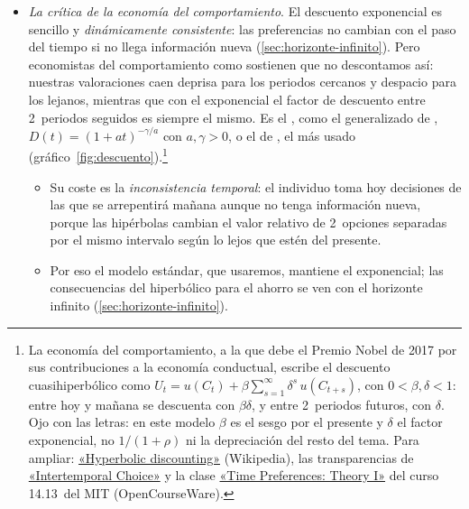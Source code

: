 \documentclass[11pt]{article}
\begin{document}
\begin{itemize}
\item \emph{La crítica de la economía del comportamiento}. El descuento exponencial es sencillo y \emph{dinámicamente consistente}: las preferencias no cambian con el paso del tiempo si no llega información nueva (\ref{sec:horizonte-infinito}). Pero economistas del comportamiento como  sostienen que no descontamos así: nuestras valoraciones caen deprisa para los periodos cercanos y despacio para los lejanos\nocite{Thaler1981Some}, mientras que con el exponencial el factor de descuento entre 2~periodos seguidos es siempre el mismo. Es el , como el generalizado de \textcite{LoewensteinPrelec1992}, $D(t)=(1+at)^{-\gamma/a}$ con $a,\gamma>0$, o el  de \textcite{Laibson1997Golden}, el más usado (gráfico~\ref{fig:descuento}).\footnote{La economía del comportamiento, a la que  debe el Premio Nobel de 2017 por sus contribuciones a la economía conductual\nocite{Nobel2017Thaler}, escribe el descuento cuasihiperbólico como $U_t=u(C_t)+\beta\sum_{s=1}^{\infty}\delta^s\,u(C_{t+s})$, con $0<\beta,\delta<1$: entre hoy y mañana se descuenta con $\beta\delta$, y entre 2~periodos futuros, con $\delta$. Ojo con las letras: en este modelo $\beta$ es el sesgo por el presente y $\delta$ el factor exponencial, no $1/(1+\rho)$ ni la depreciación del resto del tema. Para ampliar: \href{https://en.wikipedia.org/wiki/Hyperbolic_discounting}{«Hyperbolic discounting»} (Wikipedia), las transparencias de  \href{https://mark-hurlstone.github.io/Week\%207.\%20Intertemporal\%20Choice.pdf}{«Intertemporal Choice»} y la clase \href{https://ocw.mit.edu/courses/14-13-psychology-and-economics-spring-2020/resources/lec3-time-pref-theory-i/}{«Time Preferences: Theory I»} del curso 14.13~del MIT (OpenCourseWare).}
  \begin{itemize}
  \item Su coste es la \emph{inconsistencia temporal}: el individuo toma hoy decisiones de las que se arrepentirá mañana aunque no tenga información nueva, porque las hipérbolas cambian el valor relativo de 2~opciones separadas por el mismo intervalo según lo lejos que estén del presente.
  \item Por eso el modelo estándar, que usaremos, mantiene el exponencial; las consecuencias del hiperbólico para el ahorro se ven con el horizonte infinito (\ref{sec:horizonte-infinito}).
  \end{itemize}
  \begin{figure}[H]
  \centering

\end{figure}
\end{itemize}
\end{document}
